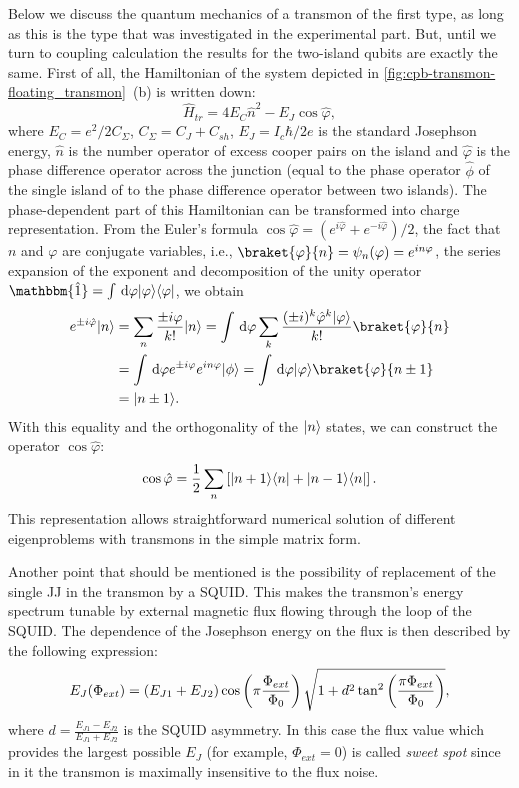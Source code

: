 Below we discuss the quantum mechanics of a transmon of the first type, as long as this is the type that was investigated in the experimental part. But, until we turn to coupling calculation the results for the two-island qubits are exactly the same. First of all, the Hamiltonian of the system depicted in \autoref{fig:cpb-transmon-floating_transmon}~(b) is written down:
\begin{equation}
\hat H_{tr} = 4E_C \hat n^2 - E_J\cos \hat \varphi,
\label{eq:tr_ham}
\end{equation}
where $E_C = e^2/2C_\Sigma$, $C_\Sigma = C_J+C_{sh}$, $E_J = I_c \hbar/2e$ is the standard Josephson energy, $\hat n$ is the number operator of excess cooper pairs on the island and $\hat \varphi$ is the phase difference operator across the junction (equal to the phase operator $\hat \phi$ of the single island of to the phase difference operator between two islands\cite{Devoret1995}). The phase-dependent part of this Hamiltonian can be transformed into charge representation. From the Euler's formula $\cos \hat \varphi = (e^{i\hat\varphi} + e^{-i\hat\varphi})/2$, the fact that $n$ and $\varphi$ are conjugate variables, i.e., $\braket{\varphi}{n} = \psi_n(\varphi) = e^{i n \varphi}$, the series expansion of the exponent and decomposition of the unity operator $\mathbbm{\hat 1} = \int \diff \varphi \ket{\varphi}\bra{\varphi}$, we obtain
\[
\begin{aligned}
e^{\pm i \hat \varphi}\ket{n} &= \sum_n \frac{\pm i\varphi}{k!}\ket{n} = \int \diff \varphi \sum_k \frac{(\pm i)^k \hat\varphi^k \ket{\varphi}}{k!}\braket{\varphi}{n}\\
&=  \int \diff \varphi e^{\pm i\varphi} e^{i n \varphi} \ket{\phi} = \int \diff \varphi \ket{\varphi}\braket{\varphi}{n\pm1}\\
&= \ket{n\pm1}.
\end{aligned}
\]
With this equality and the orthogonality of the $\lvert n\rangle$ states, we can construct the operator $\cos\hat\varphi$:
\[
\cos\hat\varphi = \frac{1}{2}\sum_n\left[ \lvert n+1\rangle\langle n\rvert + \lvert n-1\rangle\langle n\rvert \right].
\]
This representation allows straightforward numerical solution of different eigenproblems with transmons in the simple matrix form.

Another point that should be mentioned is the possibility of replacement of the single JJ in the transmon by a SQUID. This makes the transmon's energy spectrum tunable by external magnetic flux flowing through the loop of the SQUID. The dependence of the Josephson energy on the flux is then described by the following expression\cite{Koch2007}:
\[
E_J(\Phi_{ext}) = (E_{J1} + E_{J2})\cos\left( \pi\frac{\Phi_{ext}}{\Phi_0} \right)\sqrt{1+d^2\tan^2\left( \frac{\pi\Phi_{ext}}{\Phi_0} \right)},
\]
where $d = \frac{E_{J1} - E_{J2}}{E_{J1} + E_{J2}}$ is the SQUID asymmetry. In this case the flux value which provides the largest possible $E_J$ (for example, $\Phi_{ext} = 0$) is called \textit{sweet spot} since in it the transmon is maximally insensitive to the flux noise.


